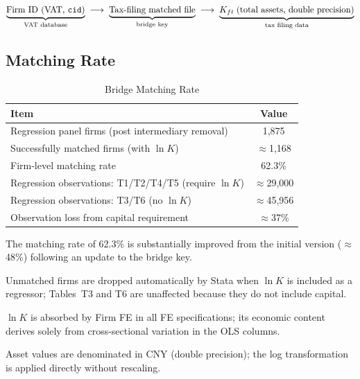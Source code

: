 \documentclass[12pt]{article}
\begin{document}
\[
  \underbrace{\text{Firm ID (VAT, \texttt{cid})}}_{\text{VAT database}}
  \;\longrightarrow\;
  \underbrace{\text{Tax-filing matched file}}_{\text{bridge key}}
  \;\longrightarrow\;
  \underbrace{K_{ft}\;(\text{total assets, double precision})}_{\text{tax filing data}}
\]

\subsection*{Matching Rate}

\begin{table}[H]
  \centering
  \caption{Bridge Matching Rate}
  \label{tab:match_rate}
  \begin{threeparttable}
    \begin{tabular}{lc}
      \toprule
      Item & Value \\
      \midrule
      Regression panel firms (post intermediary removal) & 1,875 \\
      Successfully matched firms (with \(\ln K\))        & $\approx$1,168 \\
      Firm-level matching rate                           & 62.3\% \\
      \midrule
      Regression observations: T1/T2/T4/T5 (require \(\ln K\)) & $\approx$29,000 \\
      Regression observations: T3/T6 (no \(\ln K\)) & $\approx$45,956 \\
      Observation loss from capital requirement & $\approx$37\% \\
      \bottomrule
    \end{tabular}
    \begin{tablenotes}[flushleft]
      \footnotesize
      \item The matching rate of 62.3\% is substantially improved from the
        initial version ($\approx$48\%) following an update to the bridge key.
      \item Unmatched firms are dropped automatically by Stata when
        \(\ln K\) is included as a regressor; Tables~T3 and T6 are unaffected
        because they do not include capital.
      \item \(\ln K\) is absorbed by Firm FE in all FE specifications; its
        economic content derives solely from cross-sectional variation in the
        OLS columns.
      \item Asset values are denominated in CNY (double precision); the log
        transformation is applied directly without rescaling.
    \end{tablenotes}
  \end{threeparttable}
\end{table}
\end{document}
